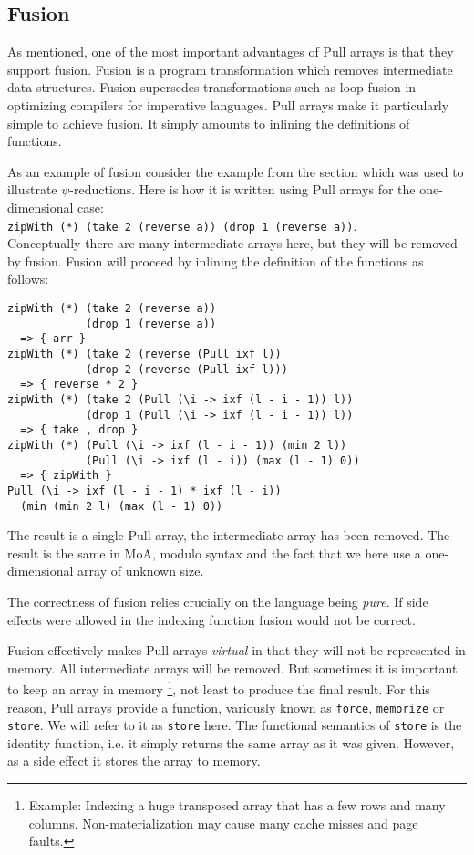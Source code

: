\documentclass[preprint]{sigplanconf}
\begin{document}
\subsection{Fusion}

As mentioned, one of the most important advantages of Pull arrays is
that they support
fusion\cite{gill1993short,axelsson2010feldspar,keller2010regular}. Fusion
is a program transformation which removes intermediate data structures.
Fusion supersedes transformations such
as loop fusion in optimizing compilers for imperative languages.  Pull
arrays make it particularly simple to achieve fusion. It simply
amounts to inlining the definitions of functions.

As an example of fusion consider the example from the section which
was used to illustrate $\psi$-reductions. Here is how it is written
using Pull arrays for the one-dimensional case:\\
{\small
\verb!zipWith (*) (take 2 (reverse a)) (drop 1 (reverse a))!}.\\
Conceptually there are many intermediate arrays here, but they will be
removed by fusion. Fusion will proceed by inlining the definition
of the functions as follows:

\begin{small}
\begin{Verbatim}
zipWith (*) (take 2 (reverse a))
            (drop 1 (reverse a))
  => { arr }
zipWith (*) (take 2 (reverse (Pull ixf l))
            (drop 2 (reverse (Pull ixf l)))
  => { reverse * 2 }
zipWith (*) (take 2 (Pull (\i -> ixf (l - i - 1)) l))
            (drop 1 (Pull (\i -> ixf (l - i - 1)) l))
  => { take , drop }
zipWith (*) (Pull (\i -> ixf (l - i - 1)) (min 2 l))
            (Pull (\i -> ixf (l - i)) (max (l - 1) 0))
  => { zipWith }
Pull (\i -> ixf (l - i - 1) * ixf (l - i))
  (min (min 2 l) (max (l - 1) 0))
\end{Verbatim}
\end{small}

The result is a single Pull array, the intermediate array has been
removed. The result is the same in MoA, modulo syntax and the fact
that we here use a one-dimensional array of unknown size.

The correctness of fusion relies crucially on the language being
\emph{pure}. If side effects were allowed in the indexing function
fusion would not be correct.

Fusion effectively makes Pull arrays \emph{virtual} in that they will
not be represented in memory. All intermediate arrays will be
removed. But sometimes it is important to keep an array in memory
\footnote{Example: Indexing a huge transposed array that has a few rows and many columns. Non-materialization
may cause many cache misses and page faults.}, 
not least to produce the final result. For this reason, Pull arrays
provide a function, variously known as \verb!force!, \verb!memorize!
  or \verb!store!. We will refer to it as \verb!store! here. The
  functional semantics of \verb!store! is the identity function,
  i.e. it simply returns the same array as it was given. However, as a
  side effect it stores the array to memory.
\end{document}
